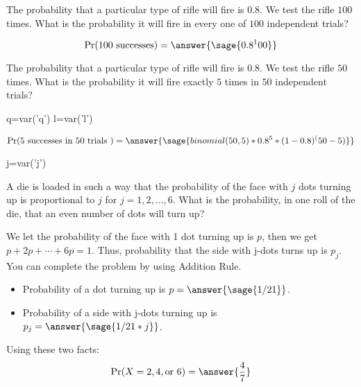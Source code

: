 \documentclass{ximera}
\begin{document}
\hspace{1cm}

\begin{problem}
The probability that a particular type of rifle will fire is $0.8$. We test the rifle $100$ times.
What is the probability it will fire in every one of $100$ independent trials? 

\begin{prompt}
\begin{equation*} 
\Pr(100 \text{ successes} ) = \answer{\sage{0.8^100}}
\end{equation*}
\end{prompt}
\end{problem}


\begin{problem}
The probability that a particular type of rifle will fire is $0.8$. We test the rifle $50$ times.
What is the probability it will fire exactly $5$ times in $50$ independent trials? 

\begin{explanation}
\begin{sagesilent}
q=var('q')
l=var('l')
\end{sagesilent}
\begin{equation*} 
\Pr(5 \text{ successes in  } 50 \text{ trials } ) = \answer{\sage{binomial(50,5)*0.8^5*(1-0.8)^(50-5)}} 
\end{equation*}
\end{explanation}
\end{problem}



\begin{problem}
\begin{sagesilent}
j=var('j')
\end{sagesilent}
A die is loaded in such a way that the probability of the face with $j$ dots turning up is proportional to $j$ for $j = 1,2, \ldots,6$. What is the probability, in one roll of the die, that an even number of dots will turn up? 
\begin{hint}
We let the probability of the face with 1 dot turning up is $p$,
then we get $p+2p+\cdots+6p=1$.
Thus, probability that the side with j-dots turns up is $p_j$.
You can complete the problem by using Addition Rule.
\end{hint}

\begin{prompt}
\begin{itemize}
    \item Probability of a dot turning up is $p=\answer{\sage{1/21}}$.
    \item Probability of a side with j-dots turning up is $p_j =\answer{\sage{1/21*j}}$.
\end{itemize}
Using these two facts:
\begin{equation*}
\Pr(X=2, 4, \text{or } 6 ) =%
\answer{\frac{4}{7}}
\end{equation*}

\end{prompt}
\end{problem}
\end{document}
